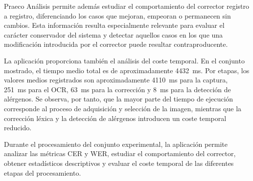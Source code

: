 Praeco Análisis permite además estudiar el comportamiento del corrector registro a registro, diferenciando los casos que mejoran, empeoran o permanecen sin cambios. Esta información resulta especialmente relevante para evaluar el carácter conservador del sistema y detectar aquellos casos en los que una modificación introducida por el corrector puede resultar contraproducente.

La aplicación proporciona también el análisis del coste temporal. En el conjunto mostrado, el tiempo medio total es de aproximadamente 4432~ms. Por etapas, los valores medios registrados son aproximadamente 4110~ms para la captura, 251~ms para el OCR, 63~ms para la corrección y 8~ms para la detección de alérgenos. Se observa, por tanto, que la mayor parte del tiempo de ejecución corresponde al proceso de adquisición y selección de la imagen, mientras que la corrección léxica y la detección de alérgenos introducen un coste temporal reducido.

Durante el procesamiento del conjunto experimental, la aplicación permite
analizar las métricas CER y WER, estudiar el comportamiento del corrector, obtener estadísticos descriptivos y evaluar el coste temporal de las diferentes etapas del procesamiento.



